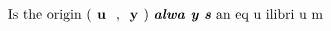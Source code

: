 \documentclass[preview]{standalone}
\begin{document}
\begin{align*}
\text{Is   the   origin   (\textbf{   u   } ,   \textbf{   y   })   \textbf{\emph{alwa y s}}   an   eq u ilibri u m}
\end{align*}
\end{document}
